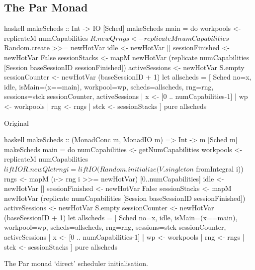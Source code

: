 \FloatBarrier
\subsection{The Par Monad}

\begin{listing}
  \begin{sublisting}{\textwidth}
    \centering
    \begin{cminted}{haskell}
makeScheds :: Int -> IO [Sched]
makeScheds main = do
   workpools <- replicateM numCapabilities $ R.newQ
   rngs <- replicateM numCapabilities $ Random.create >>= newHotVar
   idle <- newHotVar []
   sessionFinished <- newHotVar False
   sessionStacks   <- mapM newHotVar
     (replicate numCapabilities [Session baseSessionID sessionFinished])
   activeSessions  <- newHotVar S.empty
   sessionCounter  <- newHotVar (baseSessionID + 1)
   let allscheds = [ Sched { no=x, idle, isMain=(x==main), workpool=wp,
                             scheds=allscheds, rng=rng, sessions=stck
                             sessionCounter, activeSessions
                           }
                   | x   <- [0 .. numCapabilities-1]
                   | wp  <- workpools
                   | rng <- rngs
                   | stck <- sessionStacks
                   ]
   pure allscheds
    \end{cminted}
    \caption{Original}\label{lst:example-parmonad-sched-orig}
  \end{sublisting}

  \vspace{2.5em}

  \begin{sublisting}{\textwidth}
    \centering
    \begin{cminted}{haskell}
makeScheds :: (MonadConc m, MonadIO m) => Int -> m [Sched m]
makeScheds main = do
   numCapabilities <- getNumCapabilities
   workpools <- replicateM numCapabilities $ liftIO R.newQ
   let rng i = liftIO (Random.initialize (V.singleton $ fromIntegral i))
   rngs <- mapM (\i -> rng i >>= newHotVar) [0..numCapabilities]
   idle <- newHotVar []
   sessionFinished <- newHotVar False
   sessionStacks   <- mapM newHotVar
     (replicate numCapabilities [Session baseSessionID sessionFinished])
   activeSessions  <- newHotVar S.empty
   sessionCounter  <- newHotVar (baseSessionID + 1)
   let allscheds = [ Sched { no=x, idle, isMain=(x==main), workpool=wp,
                             scheds=allscheds, rng=rng, sessions=stck
                             sessionCounter, activeSessions
                           }
                   | x   <- [0 .. numCapabilities-1]
                   | wp  <- workpools
                   | rng <- rngs
                   | stck <- sessionStacks
                   ]
   pure allscheds
    \end{cminted}
    \caption{\dejafu{}}\label{lst:example-parmonad-sched-dejafu}
  \end{sublisting}
  \caption{The Par monad `direct' scheduler initialisation.}\label{lst:example-parmonad-sched}
\end{listing}

